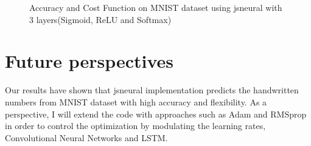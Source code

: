 \documentclass{article}
\begin{document}
\begin{figure}[H]
  \centering
  \hfill
  \caption{Accuracy and Cost Function on MNIST dataset using jsneural with 3 layers(Sigmoid, ReLU and Softmax)}
\end{figure}

\section{Future perspectives}

Our results have shown that jsneural implementation predicts the handwritten numbers from MNIST dataset with high accuracy and flexibility. As a perspective, I will extend the code with approaches such as Adam and RMSprop in order to control the optimization by modulating the learning rates, Convolutional Neural Networks and LSTM.
\end{document}
